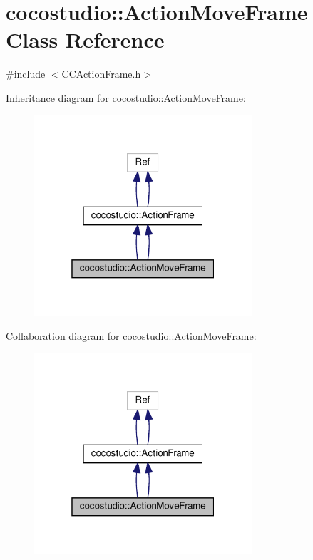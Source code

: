 \hypertarget{classcocostudio_1_1ActionMoveFrame}{}\section{cocostudio\+:\+:Action\+Move\+Frame Class Reference}
\label{classcocostudio_1_1ActionMoveFrame}


{\ttfamily \#include $<$C\+C\+Action\+Frame.\+h$>$}



Inheritance diagram for cocostudio\+:\+:Action\+Move\+Frame\+:
\nopagebreak
\begin{figure}[H]
\begin{center}
\leavevmode
\includegraphics[width=229pt]{classcocostudio_1_1ActionMoveFrame__inherit__graph}
\end{center}
\end{figure}


Collaboration diagram for cocostudio\+:\+:Action\+Move\+Frame\+:
\nopagebreak
\begin{figure}[H]
\begin{center}
\leavevmode
\includegraphics[width=229pt]{classcocostudio_1_1ActionMoveFrame__coll__graph}
\end{center}
\end{figure}
